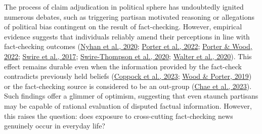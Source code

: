 \documentclass[
  12pt,
]{article}
\begin{document}
The process of claim adjudication in political sphere has undoubtedly
ignited numerous debates, such as triggering partisan motivated
reasoning or allegations of political bias contingent on the result of
fact-checking. However, empirical evidence suggests that individuals
reliably amend their perceptions in line with fact-checking outcomes
(\protect\hyperlink{ref-nyhan2020taking}{Nyhan et al., 2020};
\protect\hyperlink{ref-porter2022factual}{Porter et al., 2022};
\protect\hyperlink{ref-porter2022political}{Porter \& Wood, 2022};
\protect\hyperlink{ref-swire2017processing}{Swire et al., 2017};
\protect\hyperlink{ref-swire2020they}{Swire-Thompson et al., 2020};
\protect\hyperlink{ref-walter2020fact}{Walter et al., 2020}). This
effect remains durable even when the information provided by the
fact-check contradicts previously held beliefs
(\protect\hyperlink{ref-coppock2023conceptual}{Coppock et al., 2023};
\protect\hyperlink{ref-wood2019elusive}{Wood \& Porter, 2019}) or the
fact-checking source is considered to be an out-group
(\protect\hyperlink{ref-chae2023perceiving}{Chae et al., 2023}). Such
findings offer a glimmer of optimism, suggesting that even staunch
partisans may be capable of rational evaluation of disputed factual
information. However, this raises the question: does exposure to
cross-cutting fact-checking news genuinely occur in everyday life?
\end{document}
